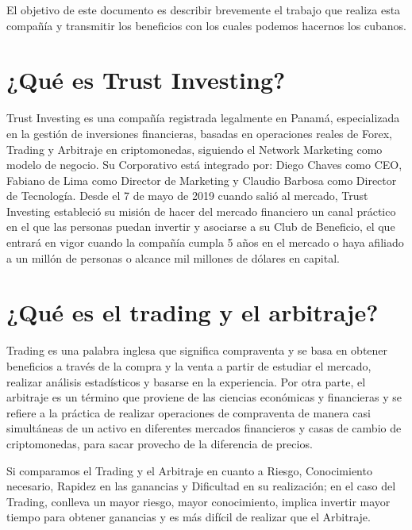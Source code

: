 \documentclass[12pt,letterpaper]{article}
\begin{document}
	El objetivo de este documento es describir brevemente el trabajo que realiza esta compañía y transmitir los beneficios con los cuales podemos hacernos los cubanos.
	
	
	
	\newpage
	\section{¿Qué es Trust Investing?}
	Trust Investing es una compañía registrada legalmente en Panamá, especializada en la gestión de inversiones financieras, basadas en operaciones reales de Forex, Trading y Arbitraje en criptomonedas, siguiendo el Network Marketing como modelo de negocio. Su Corporativo está integrado por: Diego Chaves como CEO, Fabiano de Lima como Director de Marketing y Claudio Barbosa como Director de Tecnología. Desde el 7 de mayo de 2019 cuando salió al mercado, Trust Investing estableció su misión de hacer del mercado financiero un canal práctico en el que las personas puedan invertir y asociarse a su Club de Beneficio, el que entrará en vigor cuando la compañía cumpla 5 años en el mercado o haya afiliado a un millón de personas o alcance mil millones de dólares en capital.
	
	\section{¿Qué es el trading y el arbitraje?}
	Trading es una palabra inglesa que significa compraventa y se basa en obtener beneficios a través de la compra y la venta a partir de estudiar el mercado, realizar análisis estadísticos y basarse en la experiencia. Por otra parte, el arbitraje es un término que proviene de las ciencias económicas y financieras y se refiere a la práctica de realizar operaciones de compraventa de manera casi simultáneas de un activo en diferentes mercados financieros y casas de cambio de criptomonedas, para sacar provecho de la diferencia de precios.
	
	Si comparamos el Trading y el Arbitraje en cuanto a Riesgo, Conocimiento necesario, Rapidez en las ganancias y Dificultad en su realización; en el caso del Trading, conlleva un mayor riesgo, mayor conocimiento, implica invertir mayor tiempo para obtener ganancias y es más difícil de realizar que el Arbitraje.
	
\end{document}

